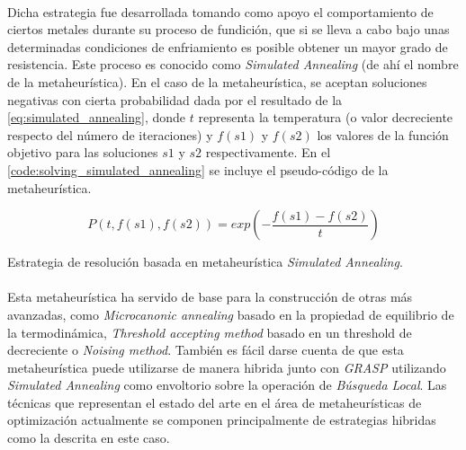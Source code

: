 \documentclass{subfiles}
\begin{document}
        \paragraph{}
        Dicha estrategia fue desarrollada tomando como apoyo el comportamiento de ciertos metales durante su proceso de fundición, que si se lleva a cabo bajo unas determinadas condiciones de enfriamiento es posible obtener un mayor grado de resistencia. Este proceso es conocido como \emph{Simulated Annealing} (de ahí el nombre de la metaheurística). En el caso de la metaheurística, se aceptan soluciones negativas con cierta probabilidad dada por el resultado de la \cref{eq:simulated_annealing}, donde $t$ representa la temperatura (o valor decreciente respecto del número de iteraciones) y $f(s1)$ y $f(s2)$ los valores de la función objetivo para las soluciones $s1$ y $s2$ respectivamente. En el \cref{code:solving_simulated_annealing} se incluye el pseudo-código de la metaheurística.

        \begin{equation}
          \label{eq:simulated_annealing}
          P(t, f(s1), f(s2)) = exp\left(-\frac{f(s1) - f(s2)}{t}\right)
        \end{equation}

        \begin{algorithm}[ht]
          \SetAlgoLined
          \caption{Estrategia de resolución basada en metaheurística \emph{Simulated Annealing}.}
          \label{code:solving_simulated_annealing}
        \end{algorithm}

        \paragraph{}
        Esta metaheurística ha servido de base para la construcción de otras más avanzadas, como \emph{Microcanonic annealing} basado en la propiedad de equilibrio de la termodinámica, \emph{Threshold accepting method} basado en un threshold de decreciente o \emph{Noising method}. También es fácil darse cuenta de que esta metaheurística puede utilizarse de manera hibrida junto con \emph{GRASP} utilizando \emph{Simulated Annealing} como envoltorio sobre la operación de \emph{Búsqueda Local}. Las técnicas que representan el estado del arte en el área de metaheurísticas de optimización actualmente se componen principalmente de estrategias hibridas como la descrita en este caso.
\end{document}
